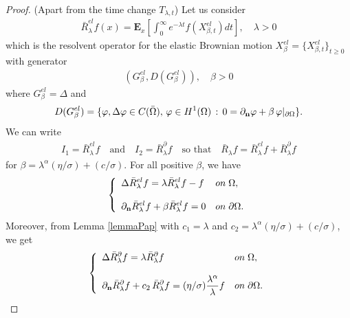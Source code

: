 \documentclass[11pt,a4paper]{article}
\begin{document}
\begin{proof}
(Apart from the time change $T_{\lambda, t}$) Let us consider
\begin{align}
\bar{R}_\lambda^{el} f(x) = \mathbf{E}_x \left[ \int_0^\infty e^{-\lambda t} f(X^{el}_{\beta,t})dt \right], \quad \lambda >0
\label{IDgenELASTIC}
\end{align}
which is the resolvent operator for the elastic Brownian motion $X^{el}_{\beta} = \{X^{el}_{\beta,t}\}_{t \geq 0}$ with generator
\begin{align*}
(G^{el}_\beta, D(G^{el}_\beta)), \quad \beta >0 
\end{align*}
where $G^{el}_\beta = \Delta$ and
\begin{align*}
D(G^{el}_\beta) = \{\varphi, \Delta \varphi \in C(\bar{\Omega}), \, \varphi \in H^1(\Omega)\,:\, 0 = \partial_{\bf n} \varphi  + \beta\, \varphi |_{\partial \Omega}\}.
\end{align*}
We can write
\begin{align*}
I_1 = \bar{R}^{el}_\lambda f \quad \textrm{and} \quad I_2 = \bar{R}^{\partial}_\lambda f \quad \textrm{so that} \quad  \bar{R}_\lambda f = \bar{R}^{el}_\lambda f +  \bar{R}^{\partial}_\lambda f
\end{align*}
for $\beta = \lambda^\alpha (\eta/\sigma) + (c/\sigma)$. For all positive $\beta$, we have
\begin{equation*}
\left\lbrace
\begin{array}{ll}
\displaystyle \Delta \bar{R}^{el}_\lambda f = \lambda \bar{R}^{el}_\lambda f - f & \textrm{on}\; \Omega,\\ 
\\
\displaystyle \partial_{\bf n} \bar{R}^{el}_\lambda f + \beta \bar{R}^{el}_\lambda f = 0 & \textrm{on}\; \partial \Omega.
\end{array}
\right .
\end{equation*}
Moreover, from Lemma \ref{lemmaPap} with $c_1=\lambda$ and $c_2 = \lambda^\alpha (\eta/\sigma) + (c/\sigma)$, we get
\begin{equation*}
\left\lbrace
\begin{array}{ll}
\displaystyle \Delta \bar{R}^{\partial}_\lambda f = \lambda \bar{R}^{\partial}_\lambda f & \textrm{on}\; \Omega,\\ 
\\
\displaystyle \partial_{\bf n} \bar{R}^{\partial}_\lambda f + c_2\, \bar{R}^{\partial}_\lambda f = (\eta/\sigma) \frac{\lambda^\alpha}{\lambda} f & \textrm{on}\; \partial \Omega.
\end{array}
\right .
\end{equation*}

\end{proof}
\end{document}
